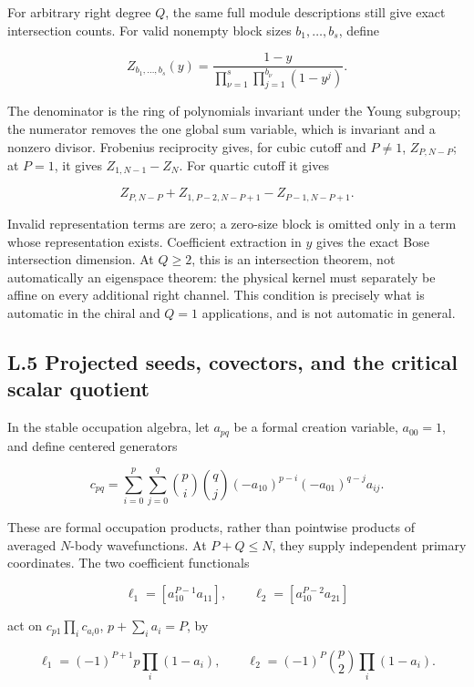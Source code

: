 \documentclass[a4paper,11pt]{article}
\numberwithin{equation}{section}
\begin{document}
For arbitrary right degree \(Q\), the same full module descriptions still give exact intersection counts. For valid nonempty block sizes \(b_1,\ldots,b_s\), define

\[
Z_{b_1,\ldots,b_s}(y)=\frac{1-y}
{\prod_{\nu=1}^s\prod_{j=1}^{b_\nu}(1-y^j)}.
\tag{L.15}
\]

The denominator is the ring of polynomials invariant under the Young subgroup; the numerator removes the one global sum variable, which is invariant and a nonzero divisor. Frobenius reciprocity gives, for cubic cutoff and \(P\ne1\), \(Z_{P,N-P}\); at \(P=1\), it gives \(Z_{1,N-1}-Z_N\). For quartic cutoff it gives

\[
Z_{P,N-P}+Z_{1,P-2,N-P+1}-Z_{P-1,N-P+1}.
\tag{L.16}
\]

Invalid representation terms are zero; a zero-size block is omitted only in a term whose representation exists. Coefficient extraction in \(y\) gives the exact Bose intersection dimension. At \(Q\ge2\), this is an intersection theorem, not automatically an eigenspace theorem: the physical kernel must separately be affine on every additional right channel. This condition is precisely what is automatic in the chiral and \(Q=1\) applications, and is not automatic in general.

\hypertarget{l.5-projected-seeds-covectors-and-the-critical-scalar-quotient}{%
\subsection{L.5 Projected seeds, covectors, and the critical scalar quotient}\label{l.5-projected-seeds-covectors-and-the-critical-scalar-quotient}}

In the stable occupation algebra, let \(a_{pq}\) be a formal creation variable, \(a_{00}=1\), and define centered generators

\[
c_{pq}=\sum_{i=0}^p\sum_{j=0}^q
\binom pi\binom qj(-a_{10})^{p-i}(-a_{01})^{q-j}a_{ij}.
\tag{L.17}
\]

These are formal occupation products, rather than pointwise products of averaged \(N\)-body wavefunctions. At \(P+Q\le N\), they supply independent primary coordinates. The two coefficient functionals

\[
\ell_1=[a_{10}^{P-1}a_{11}],\qquad
\ell_2=[a_{10}^{P-2}a_{21}]
\tag{L.18}
\]

act on \(c_{p1}\prod_i c_{a_i0}\), \(p+\sum_i a_i=P\), by

\[
\ell_1=(-1)^{P+1}p\prod_i(1-a_i),\qquad
\ell_2=(-1)^P\binom p2\prod_i(1-a_i).
\tag{L.19}
\]
\end{document}
